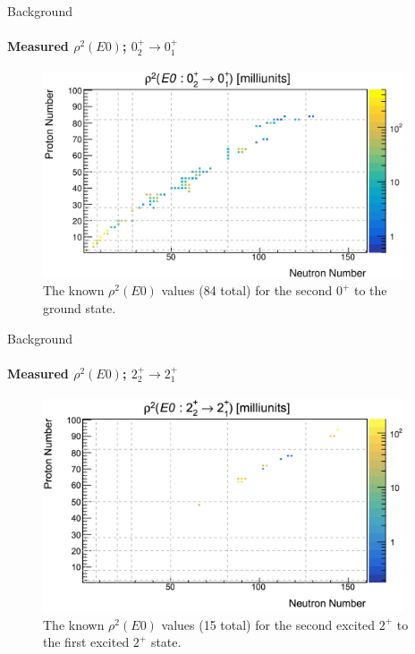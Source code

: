 \documentclass{beamer}
\begin{document}


\begin{frame}{Background}
\framesubtitle{Measured $\rho^2(E0)$; $0_2^+ \rightarrow 0_1^+$}
\begin{figure}[!hht]
  \centering
  \includegraphics[width=0.95\textwidth, keepaspectratio]{0to0Chart.png}
  \caption{The known $\rho^2(E0)$ values (84 total) for the second $0^+$ to the ground state.\footnotemark[1]}
  \label{comparisonE0for0}
\end{figure}
\end{frame}



\begin{frame}{Background}
\framesubtitle{Measured $\rho^2(E0)$; $2_2^+ \rightarrow 2_1^+$}
\begin{figure}[!hht]
  \centering
  \includegraphics[width=0.95\textwidth, keepaspectratio]{EvittsE0.png}
  \caption{The known $\rho^2(E0)$ values (15 total) for the second excited $2^+$ to the first excited $2^+$ state\footnotemark[1].}
  \label{comparisonE0for2}
\end{figure}
\end{frame}
\end{document}

